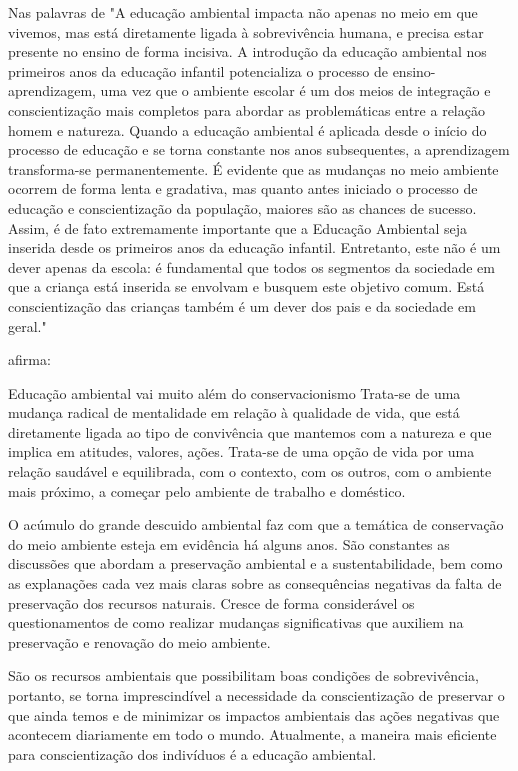 Nas palavras de  "A educação ambiental impacta não apenas no meio em que vivemos, mas está diretamente ligada à
sobrevivência humana, e precisa estar presente no ensino de forma incisiva.
A introdução da educação ambiental nos primeiros anos da educação infantil potencializa o
processo de ensino-aprendizagem, uma vez que o ambiente escolar é um dos meios de integração e
conscientização mais completos para abordar as problemáticas entre a relação homem e natureza.
Quando a educação ambiental é aplicada desde o início do processo de educação e se torna
constante nos anos subsequentes, a aprendizagem transforma-se permanentemente.
É evidente que as mudanças no meio ambiente ocorrem de forma lenta e gradativa, mas quanto
antes iniciado o processo de educação e conscientização da população, maiores são as chances de
sucesso. Assim, é de fato extremamente importante que a Educação Ambiental seja inserida desde
os primeiros anos da educação infantil.
Entretanto, este não é um dever apenas da escola: é fundamental que todos os segmentos da
sociedade em que a criança está inserida se envolvam e busquem este objetivo comum. Está
conscientização das crianças também é um dever dos pais e da sociedade em geral."

 afirma:

\begin{citacao}
    Educação ambiental vai muito além do conservacionismo Trata-se de uma mudança radical de mentalidade em relação à qualidade de vida, que está diretamente ligada ao tipo de convivência que mantemos com a natureza e que implica em atitudes, valores, ações. Trata-se de uma opção de vida por uma relação saudável e equilibrada, com o contexto, com os outros, com o ambiente mais próximo, a começar pelo ambiente de trabalho e doméstico.
\end{citacao}

O acúmulo do grande descuido ambiental faz com que a temática de conservação do meio ambiente esteja em evidência há alguns anos. São constantes as discussões que abordam a preservação ambiental e a sustentabilidade, bem como as explanações cada vez mais claras sobre as consequências negativas da falta de preservação dos recursos naturais. Cresce de forma considerável os questionamentos de como realizar mudanças significativas que auxiliem na preservação e renovação do meio ambiente.

São os recursos ambientais que possibilitam boas condições de sobrevivência, portanto, se torna imprescindível a necessidade da conscientização de preservar o que ainda temos e de minimizar os impactos ambientais das ações negativas que acontecem diariamente em todo o mundo.  Atualmente, a maneira mais eficiente para conscientização dos indivíduos é a educação ambiental.

